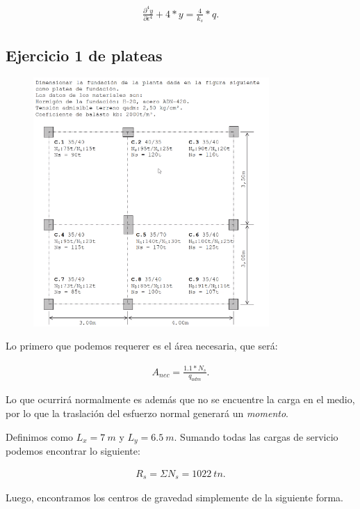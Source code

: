 \documentclass[../main.tex]{subfiles}
\begin{document}
\begin{align*}
  \frac{\partial^4 y}{\partial \epsilon^4} + 4 * y = \frac{4}{k_s}*q
.\end{align*}

\clearpage
\subsection{Ejercicio 1 de plateas}

\begin{figure}[ht]
  \centering
  \includegraphics[width=0.8\textwidth]{../images/20210421/ej1}
\end{figure}

Lo primero que podemos requerer es el área necesaria, que será:

\begin{align*}
  A_{nec}=\frac{1.1*N_s}{q_{adm}}
.\end{align*}

Lo que ocurrirá normalmente es además que no se encuentre la carga en el medio,
por lo que la traslación del esfuerzo normal generará un \textit{momento}.

Definimos como $L_x = \SI{7}{m}$ y $L_y = \SI{6.5}{m}$. Sumando todas las cargas
de servicio podemos encontrar lo siguiente:

\begin{align*}
  R_s = \Sigma N_s = \SI{1022}{tn}
.\end{align*}

Luego, encontramos los centros de gravedad simplemente de la siguiente forma.
\end{document}
